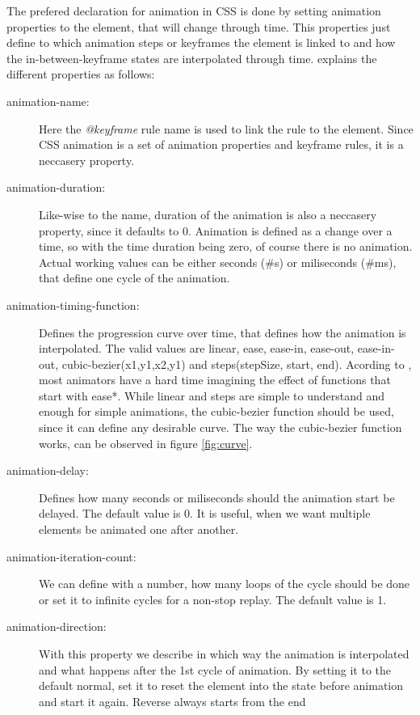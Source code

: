 The prefered declaration for animation in CSS is done by setting animation 
properties to the element, that will change through time. This properties just 
define to which animation steps or keyframes the element is linked to and how 
the in-between-keyframe states are interpolated through time. 
\citet{w3schoolAnime} explains the different properties as follows:

\begin{description}
\item [animation-name:] Here the {\em{}@keyframe} rule name is used to link the 
rule to the element. Since CSS animation is a set of animation properties and 
keyframe rules, it is a neccasery property.
\item [animation-duration:] Like-wise to the name, duration of the animation is 
also a neccasery property, since it defaults to 0. Animation is defined as a 
change over a time, so with the time duration being zero, of course there is no 
animation. Actual working values can be either seconds (\#s) or miliseconds 
(\#ms), that define one cycle of the animation.
\item [animation-timing-function:] Defines the progression curve over time, 
that defines how the animation is interpolated. The valid values are linear, 
ease, ease-in, ease-out, ease-in-out, cubic-bezier(x1,y1,x2,y1) and 
steps(stepSize, start, end). Acording to \citet{head2016designing}, most 
animators have a hard time imagining the effect of functions that start with 
ease*. While linear and steps are simple to understand and enough for simple 
animations, the cubic-bezier function should be used, since it can define any 
desirable curve. The way the cubic-bezier function works, can be observed in 
figure \ref{fig:curve}.
\item [animation-delay:] Defines how many seconds or miliseconds should the 
animation start be delayed. The default value is 0. It is useful, when we want 
multiple elements be animated one after another.
\item [animation-iteration-count:] We can define with a number, how many loops 
of the cycle should be done or set it to infinite cycles for a non-stop replay. 
The default value is 1.
\item [animation-direction:] With this property we describe in which way the 
animation is interpolated and what happens after the 1st cycle of animation. By 
setting it to the default normal, set it to reset the element into the state 
before animation and start it again. Reverse always starts from the end 

\end{description}
